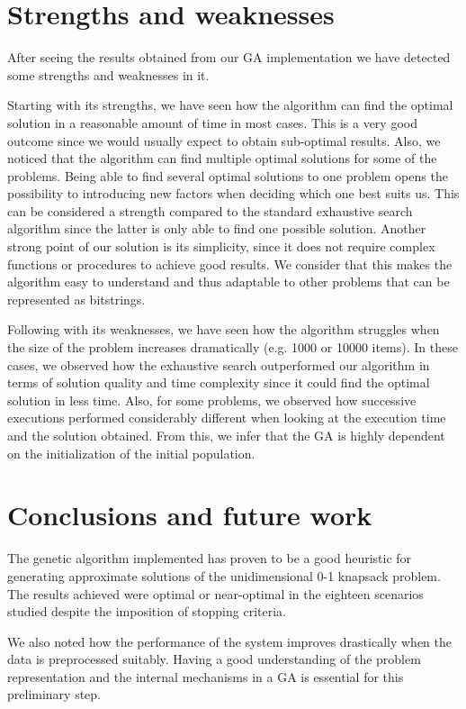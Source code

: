 \documentclass[anon]{CI}
\begin{document}
\section{Strengths and weaknesses} \label{sec:strengths}

After seeing the results obtained from our GA implementation we have detected some strengths and weaknesses in it.

Starting with its strengths, we have seen how the algorithm can find the optimal solution in a reasonable amount of time in most cases. This is a very good outcome since we would usually expect to obtain sub-optimal results. Also, we noticed that the algorithm can find multiple optimal solutions for some of the problems. Being able to find several optimal solutions to one problem opens the possibility to introducing new factors when deciding which one best suits us. This can be considered a strength compared to the standard exhaustive search algorithm since the latter is only able to find one possible solution. Another strong point of our solution is its simplicity, since it does not require complex functions or procedures to achieve good results. We consider that this makes the algorithm easy to understand and thus adaptable to other problems that can be represented as bitstrings.

Following with its weaknesses, we have seen how the algorithm struggles when the size of the problem increases dramatically (e.g. 1000 or 10000 items). In these cases, we observed how the exhaustive search outperformed our algorithm in terms of solution quality and time complexity since it could find the optimal solution in less time. Also, for some problems, we observed how successive executions performed considerably different when looking at the execution time and the solution obtained. From this, we infer that the GA is highly dependent on the initialization of the initial population.

\section{Conclusions and future work}

The genetic algorithm implemented has proven to be a good heuristic for generating approximate solutions of the unidimensional 0-1 knapsack problem. The results achieved were optimal or near-optimal in the eighteen scenarios studied despite the imposition of stopping criteria. 

We also noted how the performance of the system improves drastically when the data is preprocessed suitably. Having a good understanding of the problem representation and the internal mechanisms in a GA is essential for this preliminary step.
\end{document}
